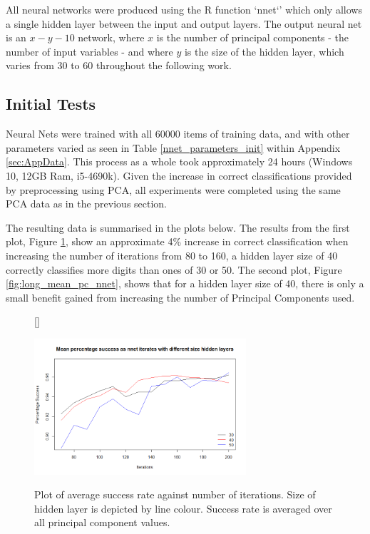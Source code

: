 \documentclass[11pt]{article} %
\begin{document}
All neural networks were produced using the R function `nnet`' which only allows a single hidden layer between the input and output layers. The output neural net is an $x - y - 10$ network, where $x$ is the number of principal components - the number of input variables - and where $y$ is the size of the hidden layer, which varies from 30 to 60 throughout the following work. 

\subsection{Initial Tests}


Neural Nets were trained with all 60000 items of training data, and with other parameters varied as seen in Table \ref{nnet_parameters_init} within Appendix \ref{sec:AppData}. This process as a whole took approximately 24 hours (Windows 10, 12GB Ram, i5-4690k). Given the increase in correct classifications provided by preprocessing using PCA, all experiments were completed using the same PCA data as in the previous section.

The resulting data is summarised in the plots below. The results from the first plot, Figure \ref{fig:long_mean_nnet}, show an approximate 4\% increase in correct classification when increasing the number of iterations from 80 to 160, a hidden layer size of 40 correctly classifies more digits than ones of 30 or 50. The second plot, Figure \ref{fig:long_mean_pc_nnet}, shows that for a hidden layer size of 40, there is only a small benefit gained from increasing the number of Principal Components used. 

\begin{figure}[htb!]
[\FBwidth]
{\caption{Plot of average success rate against number of iterations. Size of hidden layer is depicted by line colour. Success rate is averaged over all principal component values.}\label{fig:long_mean_nnet}}
{\includegraphics[width=0.7\textwidth]{long_mean_it.png}}
\end{figure}
\end{document}
